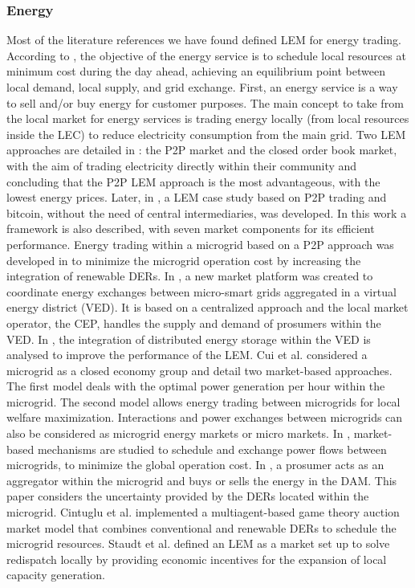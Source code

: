 \subsubsection{Energy}
Most of the literature references we have found defined LEM for energy trading. According to \cite{ilieva2016design}, the objective of the energy service is to schedule local resources at minimum cost during the day ahead, achieving an equilibrium point between local demand, local supply, and grid exchange. First, an energy service is a way to sell and/or buy energy for customer purposes. The main concept to take from the local market for energy services is trading energy locally (from local resources inside the LEC) to reduce electricity consumption from the main grid.
Two LEM approaches are detailed in \cite{mengelkamp2018blockchain}: the P2P market and the closed order book market, with the aim of trading electricity directly within their community and concluding that the P2P LEM approach is the most advantageous, with the lowest energy prices. Later, in \cite{mengelkamp2017role}, a LEM case study based on P2P trading and bitcoin, without the need of central intermediaries, was developed. In this work a framework is also described, with seven market components for its efficient performance. Energy trading within a microgrid based on a P2P approach was developed in \cite{luo2014autonomous} to minimize the microgrid operation cost by increasing the integration of renewable DERs. In \cite{menniti2014future}, a new market platform was created to coordinate energy exchanges between micro-smart grids aggregated in a virtual energy district (VED). It is based on a centralized approach and the local market operator, the CEP, handles the supply and demand of prosumers within the VED. In \cite{Menniti2015}, the integration of distributed energy storage within the VED is analysed to improve the performance of the LEM.
Cui et al. \cite{cui2014electricity} considered a microgrid as a closed economy group and detail two market-based approaches. The first model deals with the optimal power generation per hour within the microgrid. The second model allows energy trading between microgrids for local welfare maximization.
Interactions and power exchanges between microgrids can also be considered as microgrid energy markets or micro markets. In \cite{Lee2015, Gregoratti2015}, market-based mechanisms are studied to schedule and exchange power flows between microgrids, to minimize the global operation cost. In \cite{ferruzzi2016optimal}, a prosumer acts as an aggregator within the microgrid and buys or sells the energy in the DAM. This paper considers the uncertainty provided by the DERs located within the microgrid. Cintuglu et al. \cite{cintuglu2015real} implemented a multiagent-based game theory auction market model that combines conventional and renewable DERs to schedule the microgrid resources. Staudt et al. \cite{staudt2017analysis} defined an LEM as a market set up to solve redispatch locally by providing economic incentives for the expansion of local capacity generation.
